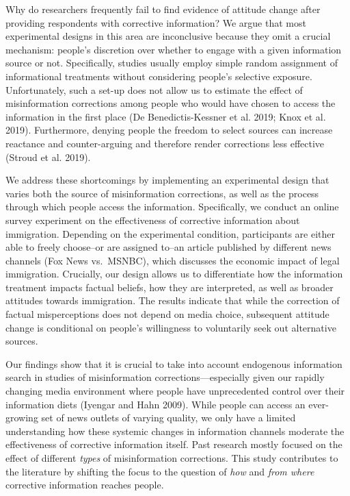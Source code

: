 \documentclass[
  12pt,
]{article}
\begin{document}
Why do researchers frequently fail to find evidence of attitude change
after providing respondents with corrective information? We argue that
most experimental designs in this area are inconclusive because they
omit a crucial mechanism: people's discretion over whether to engage
with a given information source or not. Specifically, studies usually
employ simple random assignment of informational treatments without
considering people's selective exposure. Unfortunately, such a set-up
does not allow us to estimate the effect of misinformation corrections
among people who would have chosen to access the information in the
first place (De Benedictis-Kessner et al. 2019; Knox et al. 2019).
Furthermore, denying people the freedom to select sources can increase
reactance and counter-arguing and therefore render corrections less
effective (Stroud et al. 2019).

We address these shortcomings by implementing an experimental design
that varies both the source of misinformation corrections, as well as
the process through which people access the information. Specifically,
we conduct an online survey experiment on the effectiveness of
corrective information about immigration. Depending on the experimental
condition, participants are either able to freely choose--or are
assigned to--an article published by different news channels (Fox News
vs.~MSNBC), which discusses the economic impact of legal immigration.
Crucially, our design allows us to differentiate how the information
treatment impacts factual beliefs, how they are interpreted, as well as
broader attitudes towards immigration. The results indicate that while
the correction of factual misperceptions does not depend on media
choice, subsequent attitude change is conditional on people's
willingness to voluntarily seek out alternative sources.

Our findings show that it is crucial to take into account endogenous
information search in studies of misinformation corrections---especially
given our rapidly changing media environment where people have
unprecedented control over their information diets (Iyengar and Hahn
2009). While people can access an ever-growing set of news outlets of
varying quality, we only have a limited understanding how these systemic
changes in information channels moderate the effectiveness of corrective
information itself. Past research mostly focused on the effect of
different \emph{types} of misinformation corrections. This study
contributes to the literature by shifting the focus to the question of
\emph{how} and \emph{from where} corrective information reaches people.
\end{document}
